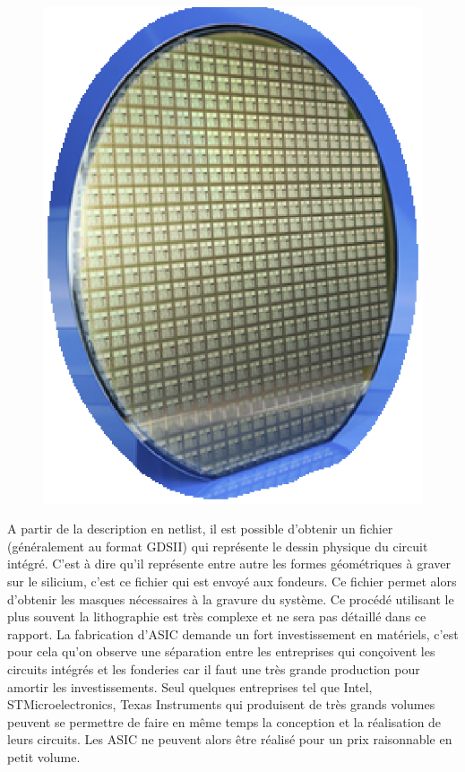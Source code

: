 \begin{figure}
\begin{center}
\includegraphics[scale=0.4]{asic.eps}
\end{center}
\end{figure}

A partir de la description en netlist, il est possible d'obtenir un fichier
(généralement au format GDSII) qui représente le dessin physique du circuit intégré.
C'est à dire qu'il représente entre autre les formes géométriques à graver sur le
silicium, c'est ce fichier qui est envoyé aux fondeurs. Ce fichier permet alors
d'obtenir les masques nécessaires à la gravure du système. Ce procédé utilisant le
plus souvent la lithographie est très complexe et ne sera pas détaillé dans ce
rapport. La fabrication d'ASIC demande un fort investissement en matériels, c'est
pour cela qu'on observe une séparation entre les entreprises qui conçoivent les
circuits intégrés et les fonderies car il faut une très grande production pour
amortir les investissements. Seul quelques entreprises tel que Intel,
STMicroelectronics, Texas Instruments qui produisent de très grands volumes peuvent
se permettre de faire en même temps la conception et la réalisation de leurs
circuits. Les ASIC ne peuvent alors être réalisé pour un prix raisonnable en petit
volume.


